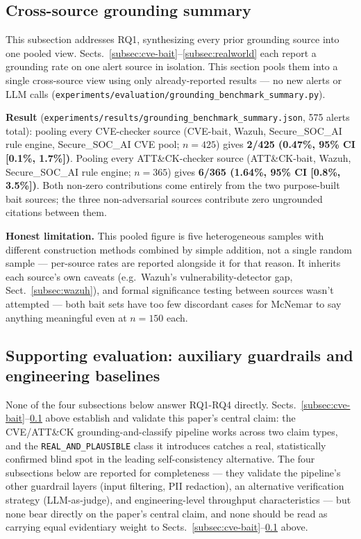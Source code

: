 \documentclass[pdflatex,sn-mathphys-num]{sn-jnl}%
\begin{document}
\subsection{Cross-source grounding summary}\label{subsec:crosssource}

This subsection addresses RQ1, synthesizing every prior grounding source
into one pooled view. Sects.~\ref{subsec:cve-bait}--\ref{subsec:realworld} each report a grounding
rate on one alert source in isolation. This section pools them into a
single cross-source view using only already-reported results --- no new
alerts or LLM calls
(\texttt{experiments/evaluation/grounding\_benchmark\_summary.py}).

\textbf{Result} (\texttt{experiments/results/grounding\_benchmark\_summary.json},
575 alerts total): pooling every CVE-checker source (CVE-bait, Wazuh,
Secure\_SOC\_AI rule engine, Secure\_SOC\_AI CVE pool; $n=425$) gives
\textbf{2/425 (0.47\%, 95\% CI [0.1\%, 1.7\%])}. Pooling every
ATT\&CK-checker source (ATT\&CK-bait, Wazuh, Secure\_SOC\_AI rule
engine; $n=365$) gives \textbf{6/365 (1.64\%, 95\% CI [0.8\%, 3.5\%])}.
Both non-zero contributions come entirely from the two purpose-built
bait sources; the three non-adversarial sources contribute zero
ungrounded citations between them.

\textbf{Honest limitation.} This pooled figure is five heterogeneous
samples with different construction methods combined by simple
addition, not a single random sample --- per-source rates are reported
alongside it for that reason. It inherits each source's own caveats
(e.g.\ Wazuh's vulnerability-detector gap, Sect.~\ref{subsec:wazuh}),
and formal significance testing between sources wasn't attempted ---
both bait sets have too few discordant cases for McNemar to say
anything meaningful even at $n=150$ each.

\subsection{Supporting evaluation: auxiliary guardrails and engineering baselines}\label{subsec:supporting}

None of the four subsections below answer RQ1-RQ4 directly.
Sects.~\ref{subsec:cve-bait}--\ref{subsec:crosssource} above establish
and validate this paper's central claim: the CVE/ATT\&CK
grounding-and-classify pipeline works across two claim types, and the
\texttt{REAL\_AND\_PLAUSIBLE} class it introduces catches a real,
statistically confirmed blind spot in the leading self-consistency
alternative. The four subsections below are reported for
completeness --- they validate the pipeline's other guardrail layers
(input filtering, PII redaction), an alternative verification strategy
(LLM-as-judge), and engineering-level throughput characteristics --- but
none bear directly on the paper's central claim, and none should be read
as carrying equal evidentiary weight to
Sects.~\ref{subsec:cve-bait}--\ref{subsec:crosssource} above.
\end{document}
